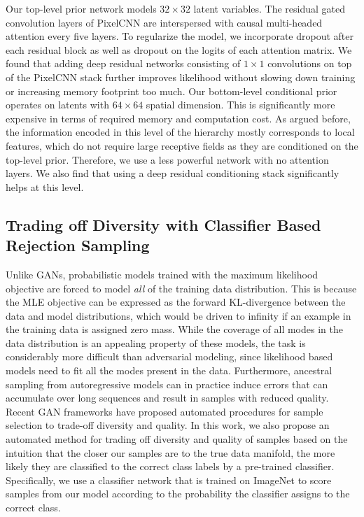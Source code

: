 \par
Our top-level prior network models $32\times32$ latent variables. The residual gated convolution layers of PixelCNN are interspersed with causal multi-headed attention every five layers. To regularize the model, we incorporate dropout after each residual block as well as dropout on the logits of each attention matrix. We found that adding deep residual networks consisting of $1\times1$ convolutions on top of the PixelCNN stack further improves likelihood without slowing down training or increasing memory footprint too much. Our bottom-level conditional prior operates on latents with $64\times64$ spatial dimension. This is significantly more expensive in terms of required memory and computation cost. As argued before, the information encoded in this level of the hierarchy mostly corresponds to local features, which do not require large receptive fields as they are conditioned on the top-level prior. Therefore, we use a less powerful network with no attention layers. We also find that using a deep residual conditioning stack significantly helps at this level. 

\subsection{Trading off Diversity with Classifier Based Rejection Sampling}
\label{critic}
Unlike GANs, probabilistic models trained with the maximum likelihood objective are forced to model \emph{all} of the training data distribution. This is because the MLE objective can be expressed as the forward KL-divergence between the data and model distributions, which would be driven to infinity if an example in the training data is assigned zero mass. While the coverage of all modes in the data distribution is an appealing property of these models, the task is considerably more difficult than adversarial modeling, since likelihood based models need to fit all the modes present in the data. Furthermore, ancestral sampling from autoregressive models can in practice induce errors that can accumulate over long sequences and result in samples with reduced quality. Recent GAN frameworks \cite{biggan,azadi2018discriminator} have proposed automated procedures for sample selection to trade-off diversity and quality. In this work, we also propose an automated method for trading off diversity and quality of samples based on the intuition that the closer our samples are to the true data manifold, the more likely they are classified to the correct class labels by a pre-trained classifier. Specifically, we use a classifier network that is trained on ImageNet to score samples from our model according to the probability the classifier assigns to the correct class. 
